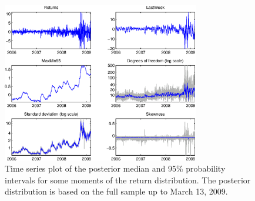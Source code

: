 \documentclass[10pt]{beamer}
\begin{document}
\begin{frame}[plain]
\begin{center}
  \begin{figure}
    \includegraphics[height=7cm]{MomentPlotSP500.eps}
  \caption{\footnotesize{Time series plot of the posterior median and 95\% probability intervals
for some moments of the return distribution. The posterior distribution is
based on the full sample up to March 13, 2009.}}
  \end{figure}
\end{center}
\end{frame}

\begin{frame}[plain]
\begin{center}
\Huge{\color{SUblue}{Thank you!}}
\end{center}
\end{frame}
\end{document}
